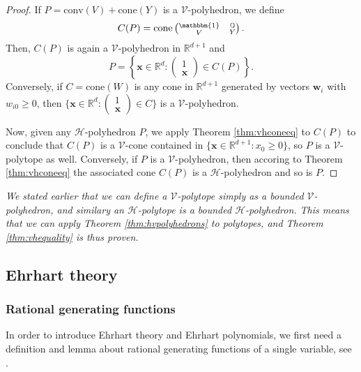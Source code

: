 \begin{proof}
			If $P = \text{conv}(V) + \text{cone}(Y)$ is a $\mathcal{V}$-polyhedron, we define 
			\[
			C(P) = \text{cone} \left( \substack{\mathbbm{1} \\ V} \quad \substack{\mathbb{O} \\ Y} 
			\right).
			\]
			Then, $C(P)$ is again a $\mathcal{V}$-polyhedron in $\mathbb{R}^{d+1}$ and 
			\[
			P = \left\{ \boldsymbol{x} \in \mathbb{R}^d : \left( \substack{1 \\ \boldsymbol{x}} 
			\right) \in C(P) \right\}.
			\]
			Conversely, if $C = \text{cone}(W)$ is any cone in $\mathbb{R}^{d+1}$ generated by 
			vectors $\boldsymbol{w}_i$ with $w_{i0} \geq 0$, then $\{\boldsymbol{x} \in 
			\mathbb{R}^d : \left( \substack{1 \\ \boldsymbol{x}} \right) \in C \}$ is a 
			$\mathcal{V}$-polyhedron. 
			
			Now, given any $\mathcal{H}$-polyhedron $P$, we apply Theorem \ref{thm:vhconeeq} to 
			$C(P)$ to conclude that $C(P)$ is a $\mathcal{V}$-cone contained in $\{\boldsymbol{x} 
			\in \mathbb{R}^{d+1} : x_0 \geq 0 \}$, so $P$ is a $\mathcal{V}$-polytope as well. 
			Conversely, if $P$ is a $\mathcal{V}$-polyhedron, then accoring to Theorem 
			\ref{thm:vhconeeq} the associated cone $C(P)$ is a $\mathcal{H}$-polyhedron and so is 
			$P$.
		\end{proof}
		
		\emph{
		We stated earlier that we can define a $\mathcal{V}$-polytope 
		simply as a bounded $\mathcal{V}$-polyhedron, and similary an $\mathcal{H}$-polytope 
		is a bounded $\mathcal{H}$-polyhedron. 
		This means that we can apply Theorem \ref{thm:hvpolyhedrons} to polytopes, and 
		Theorem \ref{thm:vhequality} is thus proven.
		}
		
\subsection{Ehrhart theory}
	
	\subsubsection{Rational generating functions}
		In order to introduce Ehrhart theory and Ehrhart polynomials, we first need a definition 
		and lemma about rational generating functions of a single variable, see \cite{braun2007ehrhart}.
		
		
